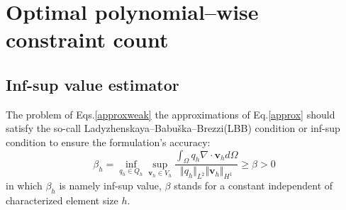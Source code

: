 \section{Optimal polynomial--wise constraint count}
\subsection{Inf-sup value estimator}
The problem of Eqs.\eqref{approxweak} the approximations of Eq.\eqref{approx} should satisfy the so-call Ladyzhenskaya–Babuška–Brezzi(LBB) condition or inf-sup condition \cite{bathe1996} to ensure the formulation's accuracy:
\begin{equation}
    \beta_h = \inf_{q_h \in Q_h} \sup_{\boldsymbol v_h \in V_h} \frac{\int_{\Omega} q_h \nabla \cdot \boldsymbol v_h d\Omega}{\Vert q_h \Vert_{L^2} \Vert \boldsymbol v_h \Vert_{H^1}} \ge \beta > 0
\end{equation}
in which $\beta_h$ is namely inf-sup value, $\beta$ stands for a constant independent of characterized element size $h$.

